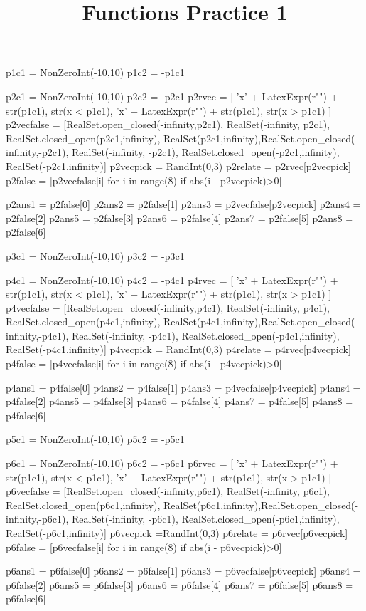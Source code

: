 \documentclass{ximeraXloud}
\title{Functions Practice 1}
\begin{document}


\begin{sagesilent}
p1c1 = NonZeroInt(-10,10)
p1c2 = -p1c1

p2c1 = NonZeroInt(-10,10)
p2c2 = -p2c1
p2rvec = [ 'x' + LatexExpr(r"\leq") + str(p1c1), str(x < p1c1), 'x' + LatexExpr(r"\geq") + str(p1c1), str(x > p1c1) ]
p2vecfalse = [RealSet.open_closed(-infinity,p2c1), RealSet(-infinity, p2c1), RealSet.closed_open(p2c1,infinity), RealSet(p2c1,infinity),RealSet.open_closed(-infinity,-p2c1), RealSet(-infinity, -p2c1), RealSet.closed_open(-p2c1,infinity), RealSet(-p2c1,infinity)]
p2vecpick = RandInt(0,3)
p2relate = p2rvec[p2vecpick]
p2false = [p2vecfalse[i] for i in range(8) if abs(i - p2vecpick)>0]

p2ans1 = p2false[0]
p2ans2 = p2false[1]
p2ans3 = p2vecfalse[p2vecpick]
p2ans4 = p2false[2]
p2ans5 = p2false[3]
p2ans6 = p2false[4]
p2ans7 = p2false[5]
p2ans8 = p2false[6]

p3c1 = NonZeroInt(-10,10)
p3c2 = -p3c1

p4c1 = NonZeroInt(-10,10)
p4c2 = -p4c1
p4rvec = [ 'x' + LatexExpr(r"\leq") + str(p1c1), str(x < p1c1), 'x' + LatexExpr(r"\geq") + str(p1c1), str(x > p1c1) ]
p4vecfalse = [RealSet.open_closed(-infinity,p4c1), RealSet(-infinity, p4c1), RealSet.closed_open(p4c1,infinity), RealSet(p4c1,infinity),RealSet.open_closed(-infinity,-p4c1), RealSet(-infinity, -p4c1), RealSet.closed_open(-p4c1,infinity), RealSet(-p4c1,infinity)]
p4vecpick = RandInt(0,3)
p4relate = p4rvec[p4vecpick]
p4false = [p4vecfalse[i] for i in range(8) if abs(i - p4vecpick)>0]

p4ans1 = p4false[0]
p4ans2 = p4false[1]
p4ans3 = p4vecfalse[p4vecpick]
p4ans4 = p4false[2]
p4ans5 = p4false[3]
p4ans6 = p4false[4]
p4ans7 = p4false[5]
p4ans8 = p4false[6]

p5c1 = NonZeroInt(-10,10)
p5c2 = -p5c1

p6c1 = NonZeroInt(-10,10)
p6c2 = -p6c1
p6rvec = [ 'x' + LatexExpr(r"\leq") + str(p1c1), str(x < p1c1), 'x' + LatexExpr(r"\geq") + str(p1c1), str(x > p1c1) ]
p6vecfalse = [RealSet.open_closed(-infinity,p6c1), RealSet(-infinity, p6c1), RealSet.closed_open(p6c1,infinity), RealSet(p6c1,infinity),RealSet.open_closed(-infinity,-p6c1), RealSet(-infinity, -p6c1), RealSet.closed_open(-p6c1,infinity), RealSet(-p6c1,infinity)]
p6vecpick =RandInt(0,3)
p6relate = p6rvec[p6vecpick]
p6false = [p6vecfalse[i] for i in range(8) if abs(i - p6vecpick)>0]

p6ans1 = p6false[0]
p6ans2 = p6false[1]
p6ans3 = p6vecfalse[p6vecpick]
p6ans4 = p6false[2]
p6ans5 = p6false[3]
p6ans6 = p6false[4]
p6ans7 = p6false[5]
p6ans8 = p6false[6]



\end{sagesilent}
\end{document}
